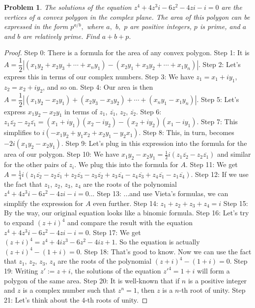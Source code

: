 \documentclass{article}
\newtheorem{theorem}{Problem}
\begin{document}
\begin{theorem}
The solutions of the equation $z^4+4z^3i-6z^2-4zi-i=0$ are the vertices of a convex polygon in the complex plane. The area of this polygon can be expressed in the form $p^{a/b},$ where $a,$ $b,$ $p$ are positive integers, $p$ is prime, and $a$ and $b$ are relatively prime. Find $a + b + p.$
\end{theorem}

\begin{proof}
Step 0: There is a formula for the area of any convex polygon.
Step 1: It is $A=\dfrac{1}{2} |(x_1 y_2 + x_2 y_3 + \cdots + x_n y_1) - (x_2 y_1 + x_3 y_2 + \cdots + x_1 y_n)|$.
Step 2: Let's express this in terms of our complex numbers.
Step 3: We have $z_1=x_1+i y_1$, $z_2=x_2+i y_2$, and so on.
Step 4: Our area is then $A=\dfrac{1}{2} |(x_1 y_2 - x_2 y_1) + (x_2 y_3 - x_3 y_2) + \cdots + (x_n y_1 - x_1 y_n)|$.
Step 5: Let's express $x_1y_2-x_2y_1$ in terms of $z_1$, $\overline{z_1}$, $z_2$, $\overline{z_2}$.
Step 6: $z_1 \overline{z_2} - z_2 \overline{z_1} = (x_1 + i y_1)(x_2 - i y_2) - (x_2 + i y_2)(x_1 - i y_1)$.
Step 7: This simplifies to $i(-x_1y_2+y_1x_2+x_2y_1-y_2x_1)$.
Step 8: This, in turn, becomes $-2i(x_1y_2-x_2y_1)$.
Step 9: Let's plug in this expression into the formula for the area of our polygon.
Step 10: We have $x_1y_2-x_2y_1=\frac{1}{2}i(z_1 \overline{z_2} - z_2 \overline{z_1})$ and similar for the other pairs of $z_i$. We plug this into the formula for $A$.
Step 11: We get $A=\frac{1}{4}i(z_1 \overline{z_2} - z_2 \overline{z_1}+z_2 \overline{z_3} - z_3 \overline{z_2}+z_3 \overline{z_4} - z_4 \overline{z_3}+z_4 \overline{z_1} - z_1 \overline{z_4})$.
Step 12: If we use the fact that $z_1$, $z_2$, $z_3$, $z_4$ are the roots of the polynomial $z^4+4z^3i-6z^2-4zi-i=0$...
Step 13: ...and use Vieta's formulas, we can simplify the expression for $A$ even further.
Step 14: $z_1+z_2+z_3+z_4=i$
Step 15: By the way, our original equation looks like a binomic formula.
Step 16: Let's try to expand $(z+i)^4$ and compare the result with the equation $z^4+4z^3i-6z^2-4zi-i=0$.
Step 17: We get $(z+i)^4=z^4+4iz^3-6z^2-4iz+1$. So the equation is actually $(z+i)^4-(1+i)=0$.
Step 18: That's good to know. Now we can use the fact that $z_1$, $z_2$, $z_3$, $z_4$ are the roots of the polynomial $(z+i)^4-(1+i)=0$.
Step 19: Writing $z':=z+i$, the solutions of the equation $z'^4=1+i$ will form a polygon of the same area.
Step 20: It is well-known that if $n$ is a positive integer and $z$ is a complex number such that $z^n=1$, then $z$ is a $n$-th root of unity.
Step 21: Let's think about the $4$-th roots of unity.

\end{proof}
\end{document}
